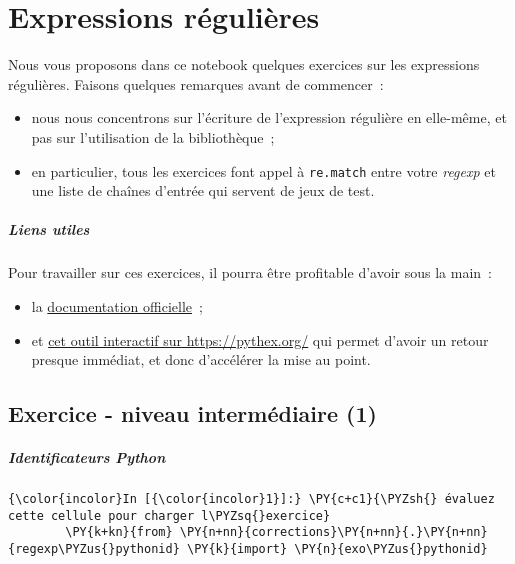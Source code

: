     
    
    
    

    

    \hypertarget{expressions-ruxe9guliuxe8res}{%
\section{Expressions régulières}\label{expressions-ruxe9guliuxe8res}}

    Nous vous proposons dans ce notebook quelques exercices sur les
expressions régulières. Faisons quelques remarques avant de commencer~:

\begin{itemize}
\tightlist
\item
  nous nous concentrons sur l'écriture de l'expression régulière en
  elle-même, et pas sur l'utilisation de la bibliothèque~;
\item
  en particulier, tous les exercices font appel à \texttt{re.match}
  entre votre \emph{regexp} et une liste de chaînes d'entrée qui servent
  de jeux de test.
\end{itemize}

    \hypertarget{liens-utiles}{%
\subparagraph{Liens utiles}\label{liens-utiles}}

    Pour travailler sur ces exercices, il pourra être profitable d'avoir
sous la main~:

\begin{itemize}
\tightlist
\item
  la
  \href{https://docs.python.org/3/library/re.html\#regular-expression-syntax}{documentation
  officielle}~;
\item
  et \href{https://pythex.org/}{cet outil interactif sur
  https://pythex.org/} qui permet d'avoir un retour presque immédiat, et
  donc d'accélérer la mise au point.
\end{itemize}

    \hypertarget{exercice---niveau-intermuxe9diaire-1}{%
\subsection{Exercice - niveau intermédiaire
(1)}\label{exercice---niveau-intermuxe9diaire-1}}

    \hypertarget{identificateurs-python}{%
\subparagraph{Identificateurs Python}\label{identificateurs-python}}

    \begin{Verbatim}[commandchars=\\\{\}]
{\color{incolor}In [{\color{incolor}1}]:} \PY{c+c1}{\PYZsh{} évaluez cette cellule pour charger l\PYZsq{}exercice}
        \PY{k+kn}{from} \PY{n+nn}{corrections}\PY{n+nn}{.}\PY{n+nn}{regexp\PYZus{}pythonid} \PY{k}{import} \PY{n}{exo\PYZus{}pythonid}
\end{Verbatim}


